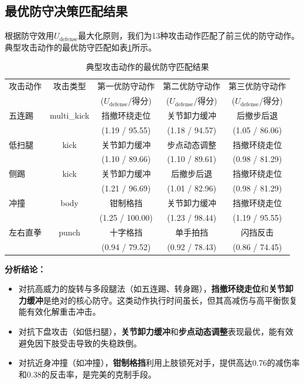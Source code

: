 \documentclass[a4paper,12pt]{article}
\numberwithin{equation}{section}
\numberwithin{table}{section}
\numberwithin{figure}{section}
\begin{document}
\subsection{最优防守决策匹配结果}

根据防守效用$U_{\text{defense}}$最大化原则，我们为13种攻击动作匹配了前三优的防守动作。典型攻击动作的最优防守匹配如表\ref{tab:defense_match}所示。

\begin{table}[H]
    \centering
    \caption{典型攻击动作的最优防守匹配结果}
    \label{tab:defense_match}
    \small
    \begin{tabular}{lcccc}
        \toprule
        攻击动作 & 攻击类型 & 第一优防守动作 & 第二优防守动作 & 第三优防守动作 \\
         & & ($U_{\text{defense}}$/得分) & ($U_{\text{defense}}$/得分) & ($U_{\text{defense}}$/得分) \\
        \midrule
        五连踢 & multi\_kick & 挡撤环绕走位 & 关节卸力缓冲 & 后撤步后退 \\
         & & (1.19 / 95.55) & (1.18 / 94.57) & (1.05 / 86.06) \\
        低扫腿 & kick & 关节卸力缓冲 & 步点动态调整 & 挡撤环绕走位 \\
         & & (1.10 / 89.66) & (1.10 / 89.61) & (0.98 / 81.29) \\
        侧踢 & kick & 关节卸力缓冲 & 后撤步后退 & 挡撤环绕走位 \\
         & & (1.21 / 96.69) & (1.01 / 82.96) & (0.98 / 81.29) \\
        冲撞 & body & 钳制格挡 & 关节卸力缓冲 & 挡撤环绕走位 \\
         & & (1.25 / 100.00) & (1.23 / 98.44) & (1.19 / 95.55) \\
        左右直拳 & punch & 十字格挡 & 单手拍挡 & 闪挡反击 \\
         & & (0.94 / 79.52) & (0.92 / 78.43) & (0.86 / 74.45) \\
        \bottomrule
    \end{tabular}
\end{table}

\textbf{分析结论：}
\begin{itemize}
    \item 对抗高威力的旋转与多段腿法（如五连踢、转身踢），\textbf{挡撤环绕走位}和\textbf{关节卸力缓冲}是绝对的核心防守。这类动作执行时间虽长，但其高减伤与高平衡恢复能有效化解重击冲击。
    \item 对抗下盘攻击（如低扫腿），\textbf{关节卸力缓冲}和\textbf{步点动态调整}表现最优，能有效避免因下肢受击导致的失稳跌倒。
    \item 对抗近身冲撞（如冲撞），\textbf{钳制格挡}利用上肢锁死对手，提供高达0.76的减伤率和0.38的反击率，是完美的克制手段。
\end{itemize}
\end{document}
